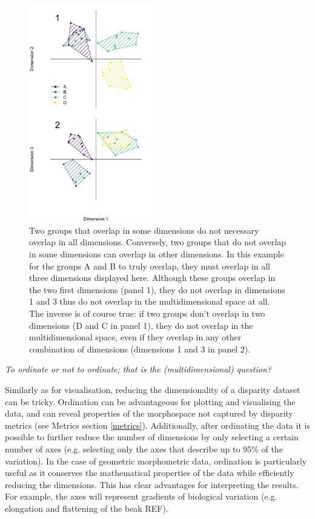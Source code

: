 \documentclass[12pt,letterpaper]{article}
\renewcommand{\subsection}[1]{%
\bigskip
\begin{center}
\begin{large}
\normalfont\itshape #1
\end{large}
\end{center}}
\begin{document}
\begin{figure}[!htbp]
\centering
   \includegraphics[width=0.5\textwidth]{Figures/dimensionsOverlap.pdf}
\caption{\small{Two groups that overlap in some dimensions do not necessary overlap in all dimensions. 
Conversely, two groups that do not overlap in some dimensions can overlap in other dimensions.
In this example for the groups A and B to truly overlap, they must overlap in all three dimensions displayed here.
Although these groups overlap in the two first dimensions (panel 1), they do not overlap in dimensions 1 and 3 thus do not overlap in the multidimensional space at all.
The inverse is of course true: if two groups don't overlap in two dimensions (D and C in panel 1), they do not overlap in the multidimensional space, even if they overlap in any other combination of dimensions (dimensions 1 and 3 in panel 2).}} 
\label{Fig:RF_results_best}
\end{figure}



\subsection{To ordinate or not to ordinate; that is the (multidimensional) question?}
Similarly as for visualisation, reducing the dimensionality of a disparity dataset can be tricky.
Ordination can be advantageous for plotting and visualising the data, and can reveal properties of the morphospace not captured by disparity metrics (see Metrics section \ref{metrics}).
Additionally, after ordinating the data it is possible to further reduce the number of dimensions by only selecting a certain number of axes (e.g. selecting only the axes that describe up to 95\% of the variation).
In the case of geometric morphometric data, ordination is particularly useful as it conserves the mathematical properties of the data while efficiently reducing the dimensions.
This has clear advantages for interpreting the results.
For example, the axes will represent gradients of biological variation (e.g. elongation and flattening of the beak REF).
\end{document}
